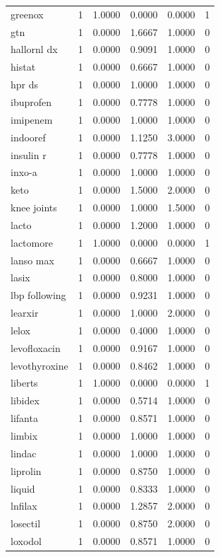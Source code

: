 \begin{longtable}{p{3.0cm}rrrrr}
greenox & 1 & 1.0000 & 0.0000 & 0.0000 & 1 \\
gtn & 1 & 0.0000 & 1.6667 & 1.0000 & 0 \\
hallornl dx & 1 & 0.0000 & 0.9091 & 1.0000 & 0 \\
histat & 1 & 0.0000 & 0.6667 & 1.0000 & 0 \\
hpr ds & 1 & 0.0000 & 1.0000 & 1.0000 & 0 \\
ibuprofen & 1 & 0.0000 & 0.7778 & 1.0000 & 0 \\
imipenem & 1 & 0.0000 & 1.0000 & 1.0000 & 0 \\
indooref & 1 & 0.0000 & 1.1250 & 3.0000 & 0 \\
insulin r & 1 & 0.0000 & 0.7778 & 1.0000 & 0 \\
inxo-a & 1 & 0.0000 & 1.0000 & 1.0000 & 0 \\
keto & 1 & 0.0000 & 1.5000 & 2.0000 & 0 \\
knee joints & 1 & 0.0000 & 1.0000 & 1.5000 & 0 \\
lacto & 1 & 0.0000 & 1.2000 & 1.0000 & 0 \\
lactomore & 1 & 1.0000 & 0.0000 & 0.0000 & 1 \\
lanso max & 1 & 0.0000 & 0.6667 & 1.0000 & 0 \\
lasix & 1 & 0.0000 & 0.8000 & 1.0000 & 0 \\
lbp following & 1 & 0.0000 & 0.9231 & 1.0000 & 0 \\
learxir & 1 & 0.0000 & 1.0000 & 2.0000 & 0 \\
lelox & 1 & 0.0000 & 0.4000 & 1.0000 & 0 \\
levofloxacin & 1 & 0.0000 & 0.9167 & 1.0000 & 0 \\
levothyroxine & 1 & 0.0000 & 0.8462 & 1.0000 & 0 \\
liberts & 1 & 1.0000 & 0.0000 & 0.0000 & 1 \\
libidex & 1 & 0.0000 & 0.5714 & 1.0000 & 0 \\
lifanta & 1 & 0.0000 & 0.8571 & 1.0000 & 0 \\
limbix & 1 & 0.0000 & 1.0000 & 1.0000 & 0 \\
lindac & 1 & 0.0000 & 1.0000 & 1.0000 & 0 \\
liprolin & 1 & 0.0000 & 0.8750 & 1.0000 & 0 \\
liquid & 1 & 0.0000 & 0.8333 & 1.0000 & 0 \\
lnfilax & 1 & 0.0000 & 1.2857 & 2.0000 & 0 \\
losectil & 1 & 0.0000 & 0.8750 & 2.0000 & 0 \\
loxodol & 1 & 0.0000 & 0.8571 & 1.0000 & 0 \\

\end{longtable}
